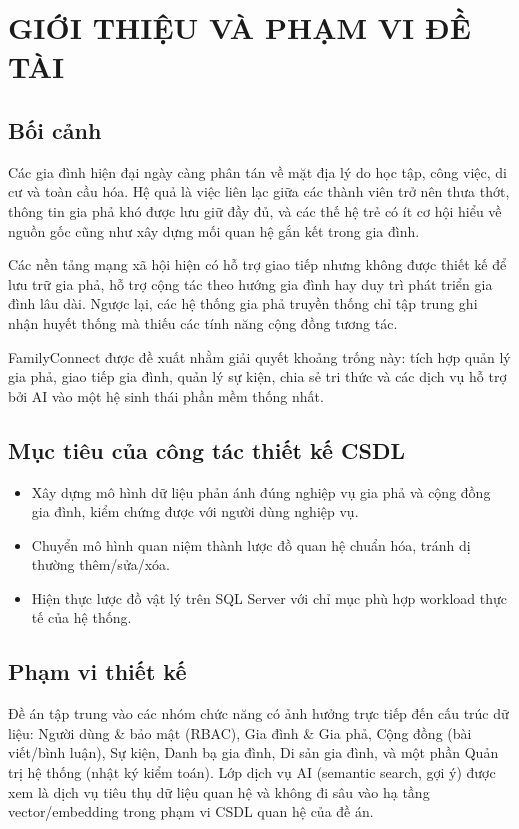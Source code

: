 \chapter{GIỚI THIỆU VÀ PHẠM VI ĐỀ TÀI}

\section{Bối cảnh}

Các gia đình hiện đại ngày càng phân tán về mặt địa lý do học tập, công việc, di cư và toàn cầu hóa. Hệ quả là việc liên lạc giữa các thành viên trở nên thưa thớt, thông tin gia phả khó được lưu giữ đầy đủ, và các thế hệ trẻ có ít cơ hội hiểu về nguồn gốc cũng như xây dựng mối quan hệ gắn kết trong gia đình.

Các nền tảng mạng xã hội hiện có hỗ trợ giao tiếp nhưng không được thiết kế để lưu trữ gia phả, hỗ trợ cộng tác theo hướng gia đình hay duy trì phát triển gia đình lâu dài. Ngược lại, các hệ thống gia phả truyền thống chỉ tập trung ghi nhận huyết thống mà thiếu các tính năng cộng đồng tương tác.

FamilyConnect được đề xuất nhằm giải quyết khoảng trống này: tích hợp quản lý gia phả, giao tiếp gia đình, quản lý sự kiện, chia sẻ tri thức và các dịch vụ hỗ trợ bởi AI vào một hệ sinh thái phần mềm thống nhất.

\section{Mục tiêu của công tác thiết kế CSDL}

\begin{itemize}
  \item Xây dựng mô hình dữ liệu phản ánh đúng nghiệp vụ gia phả và cộng đồng gia đình, kiểm chứng được với người dùng nghiệp vụ.
  \item Chuyển mô hình quan niệm thành lược đồ quan hệ chuẩn hóa, tránh dị thường thêm/sửa/xóa.
  \item Hiện thực lược đồ vật lý trên SQL Server với chỉ mục phù hợp workload thực tế của hệ thống.
\end{itemize}

\section{Phạm vi thiết kế}

Đề án tập trung vào các nhóm chức năng có ảnh hưởng trực tiếp đến cấu trúc dữ liệu: Người dùng \& bảo mật (RBAC), Gia đình \& Gia phả, Cộng đồng (bài viết/bình luận), Sự kiện, Danh bạ gia đình, Di sản gia đình, và một phần Quản trị hệ thống (nhật ký kiểm toán). Lớp dịch vụ AI (semantic search, gợi ý) được xem là dịch vụ tiêu thụ dữ liệu quan hệ và không đi sâu vào hạ tầng vector/embedding trong phạm vi CSDL quan hệ của đề án.

